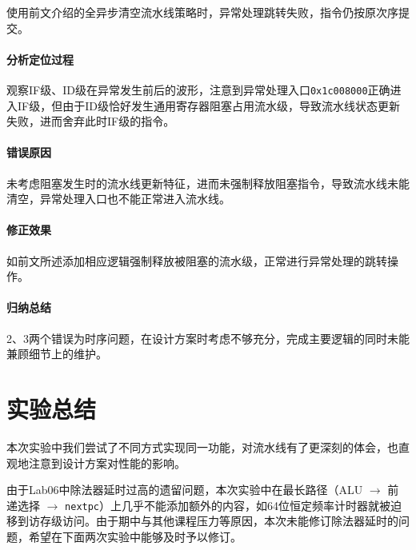 \documentclass[UTF-8,twoside,cs4size]{ctexart}
\begin{document}
    使用前文介绍的全异步清空流水线策略时，异常处理跳转失败，指令仍按原次序提交。
    
    \paragraph{分析定位过程}\hfill
    
    观察IF级、ID级在异常发生前后的波形，注意到异常处理入口\texttt{0x1c008000}正确进入IF级，但由于ID级恰好发生通用寄存器阻塞占用流水级，导致流水线状态更新失败，进而舍弃此时IF级的指令。
    
    \paragraph{错误原因}\hfill
    
    未考虑阻塞发生时的流水线更新特征，进而未强制释放阻塞指令，导致流水线未能清空，异常处理入口也不能正常进入流水线。
    
    \paragraph{修正效果}\hfill
    
    如前文所述添加相应逻辑强制释放被阻塞的流水级，正常进行异常处理的跳转操作。
    
    \paragraph{归纳总结}\hfill
    
    2、3两个错误为时序问题，在设计方案时考虑不够充分，完成主要逻辑的同时未能兼顾细节上的维护。
	\section{实验总结}
    
    本次实验中我们尝试了不同方式实现同一功能，对流水线有了更深刻的体会，也直观地注意到设计方案对性能的影响。
    
    由于Lab06中除法器延时过高的遗留问题，本次实验中在最长路径（ALU $\to$ 前递选择 $\to$ \texttt{nextpc}）上几乎不能添加额外的内容，如64位恒定频率计时器就被迫移到访存级访问。由于期中与其他课程压力等原因，本次未能修订除法器延时的问题，希望在下面两次实验中能够及时予以修订。
\end{document}

